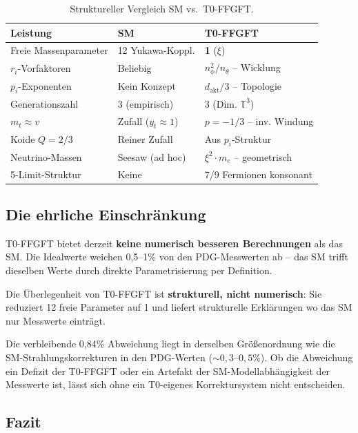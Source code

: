\begin{table}[htbp]
\centering\footnotesize
\begin{tabular}{lll}
\toprule
\textbf{Leistung} & \textbf{SM} & \textbf{T0-FFGFT} \\
\midrule
Freie Massenparameter & 12 Yukawa-Koppl. & \textbf{1} ($\xi$) \\
$r_i$-Vorfaktoren & Beliebig & $n_\phi^2/n_\theta$ -- Wicklung \\
$p_i$-Exponenten & Kein Konzept & $d_{\text{akt}}/3$ -- Topologie \\
Generationszahl & 3 (empirisch) & 3 (Dim. $\mathbb{T}^3$) \\
$m_t \approx v$ & Zufall ($y_t \approx 1$) & $p=-1/3$ -- inv. Windung \\
Koide $Q=2/3$ & Reiner Zufall & Aus $p_i$-Struktur \\
Neutrino-Massen & Seesaw (ad hoc) & $\xi^2 \cdot m_e$ -- geometrisch \\
5-Limit-Struktur & Keine & 7/9 Fermionen konsonant \\
\bottomrule
\end{tabular}
\caption{Struktureller Vergleich SM vs.\ T0-FFGFT.}
\label{tab:sm_vergleich}
\end{table}

\subsection{Die ehrliche Einschränkung}

\begin{warnbox}
T0-FFGFT bietet derzeit \textbf{keine numerisch besseren Berechnungen}
als das SM. Die Idealwerte weichen 0{,}5--1\% von den PDG-Messwerten
ab -- das SM trifft dieselben Werte durch direkte Parametrisierung
per Definition.

Die Überlegenheit von T0-FFGFT ist \textbf{strukturell, nicht numerisch}:
Sie reduziert 12 freie Parameter auf 1 und liefert strukturelle
Erklärungen wo das SM nur Messwerte einträgt.
\end{warnbox}

Die verbleibende 0{,}84\% Abweichung liegt in derselben Größenordnung
wie die SM-Strahlungskorrekturen in den PDG-Werten ($\sim 0{,}3$--$0{,}5\%$).
Ob die Abweichung ein Defizit der T0-FFGFT oder ein Artefakt der
SM-Modellabhängigkeit der Messwerte ist, lässt sich ohne ein
T0-eigenes Korrektursystem nicht entscheiden.

\subsection{Fazit}

